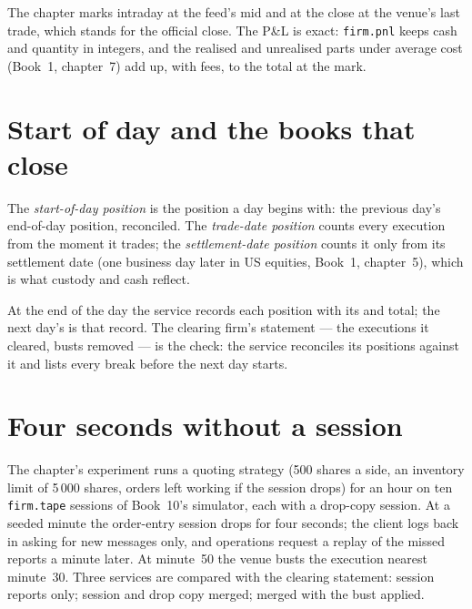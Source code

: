 The chapter marks intraday at the feed's mid and at the close at the venue's last trade, which stands for the official close. The P\&L is
exact: \texttt{firm.pnl} keeps cash and quantity in integers, and the realised and unrealised parts under average cost (Book~1, chapter~7)
add up, with fees, to the total at the mark.

\section{Start of day and the books that close}

\begin{definition}\label{def:pl:position-and-pnl-services:sod}
The \emph{start-of-day position} is the position a day begins with: the previous day's end-of-day position,
reconciled. The \emph{trade-date position} counts every execution from the moment it trades; the
\emph{settlement-date position} counts it only from its settlement date (one business day later in US
equities, Book~1, chapter~5), which is what custody and cash reflect.
\end{definition}

At the end of the day the service records each position with its  and total; the next day's  is that
record. The clearing firm's statement --- the executions it cleared, busts removed --- is the check: the service reconciles its positions
against it and lists every break before the next day starts.

\section{Four seconds without a session}

The chapter's experiment runs a quoting strategy (500 shares a side, an inventory limit of 5\,000 shares, orders left working if the session
drops) for an hour on ten \texttt{firm.tape} sessions of Book~10's simulator, each with a drop-copy session. At a seeded minute the order-entry
session drops for four seconds; the client logs back in asking for new messages only, and operations request a replay of the missed reports a
minute later. At minute~50 the venue busts the execution nearest minute~30. Three services are compared with the clearing statement: session
reports only; session and drop copy merged; merged with the bust applied.

